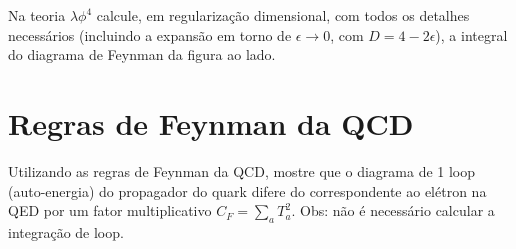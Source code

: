 \documentclass[a4paper, 11pt, oneside]{impression}
\begin{document}
\begin{exercise}{}
    \begin{multicols}{2}
        Na teoria $\lambda\phi^{4}$ calcule, em regularização dimensional, com todos os detalhes necessários (incluindo a expansão em torno de $\epsilon\to0$, com $D = 4-2\epsilon$), a integral do diagrama de Feynman da figura ao lado.
        
        \begin{center}
        \end{center}
        
        
    \end{multicols}
\end{exercise}



\chapter{Regras de Feynman da QCD}\label{quest: five}

\begin{exercise}{}
    Utilizando as regras de Feynman da QCD, mostre que o diagrama de 1 loop (auto-energia) do propagador do quark difere do correspondente ao elétron na QED por um fator multiplicativo $C_{F} = \displaystyle\sum_{a}T_{a}^{2}$. Obs: não é necessário calcular a integração de loop.
\end{exercise}
\end{document}
